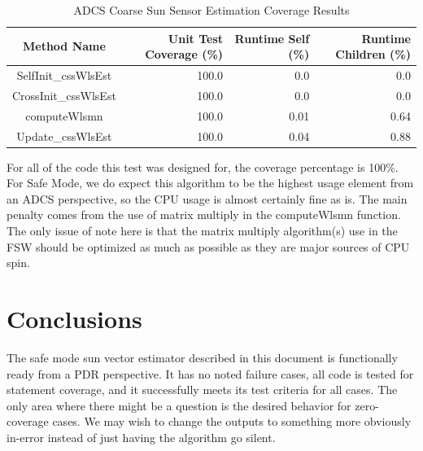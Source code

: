 \documentclass[]{BasiliskReportMemo}
\begin{document}
\begin{table}[htbp]
    \caption{ADCS Coarse Sun Sensor Estimation Coverage Results}
   \label{tab:cov_met}
        \centering \fontsize{10}{10}\selectfont
   \begin{tabular}{c | r | r | r} %
      \hline
      Method Name    & Unit Test Coverage (\%) & Runtime Self (\%) & Runtime Children (\%) \\
      \hline
      SelfInit\_cssWlsEst& 100.0 & 0.0 & 0.0 \\
      CrossInit\_cssWlsEst & 100.0 & 0.0 & 0.0 \\
      computeWlsmn & 100.0 & 0.01 & 0.64 \\
      Update\_cssWlsEst & 100.0 & 0.04 & 0.88 \\
      \hline
   \end{tabular}
\end{table}

For all of the code this test was designed for, the coverage percentage is 
100\%.  For Safe Mode, we do expect this algorithm to be the highest usage 
element from an ADCS perspective, so the CPU usage is almost certainly fine as 
is.  The main penalty comes from the use of matrix multiply in the computeWlsmn 
function.  The only issue of note here is that the matrix multiply algorithm(s) 
use in the FSW should be optimized as much as possible as they are major sources 
of CPU spin.

\section{Conclusions}
The safe mode sun vector estimator described in this document is functionally 
ready from a PDR perspective.  It has no noted failure cases, all code is tested 
for statement coverage, and it successfully meets its test criteria for all 
cases.  The only area where there might be a question is the desired behavior 
for zero-coverage cases.  We may wish to change the outputs to something more 
obviously in-error instead of just having the algorithm go silent.










%	
%
%
%








\end{document}
